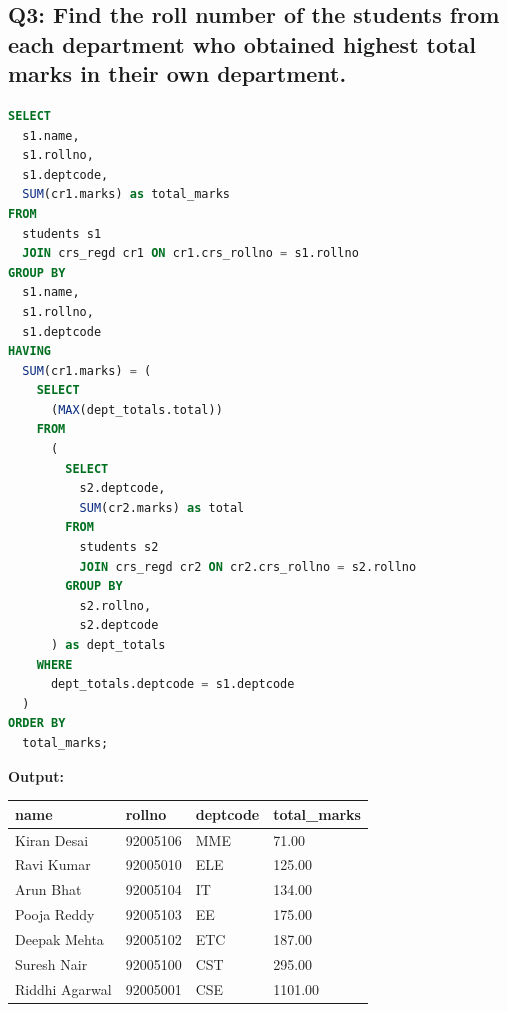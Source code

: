 \documentclass[11pt, a4paper]{article}
\begin{document}
\subsection*{Q3: Find the roll number of the students from each department who obtained highest total marks in their own department.}
\begin{lstlisting}[language=SQL]
SELECT
  s1.name,
  s1.rollno,
  s1.deptcode,
  SUM(cr1.marks) as total_marks
FROM
  students s1
  JOIN crs_regd cr1 ON cr1.crs_rollno = s1.rollno
GROUP BY
  s1.name,
  s1.rollno,
  s1.deptcode
HAVING
  SUM(cr1.marks) = (
    SELECT
      (MAX(dept_totals.total))
    FROM
      (
        SELECT
          s2.deptcode,
          SUM(cr2.marks) as total
        FROM
          students s2
          JOIN crs_regd cr2 ON cr2.crs_rollno = s2.rollno
        GROUP BY
          s2.rollno,
          s2.deptcode
      ) as dept_totals
    WHERE
      dept_totals.deptcode = s1.deptcode
  )
ORDER BY
  total_marks;
\end{lstlisting}
\vspace{0.3cm}
\textbf{Output:}\vspace{0.2cm}
\begin{center}
\begin{tabular}{|l|l|l|l|}
\hline
\textbf{name} & \textbf{rollno} & \textbf{deptcode} & \textbf{total\_marks} \\ \hline
Kiran Desai                    & 92005106 & MME & 71.00 \\ \hline
Ravi Kumar                     & 92005010 & ELE & 125.00 \\ \hline
Arun Bhat                      & 92005104 & IT  & 134.00 \\ \hline
Pooja Reddy                    & 92005103 & EE  & 175.00 \\ \hline
Deepak Mehta                   & 92005102 & ETC & 187.00 \\ \hline
Suresh Nair                    & 92005100 & CST & 295.00 \\ \hline
Riddhi Agarwal                 & 92005001 & CSE & 1101.00 \\ \hline
\end{tabular}
\end{center}
\newpage
\end{document}
